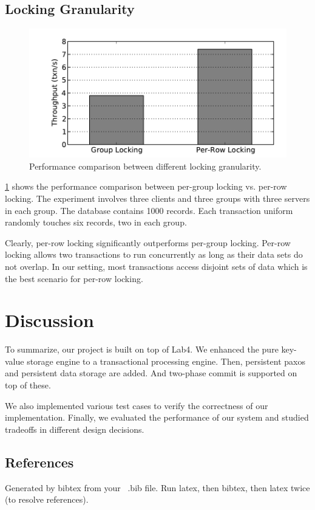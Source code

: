 \documentclass{vldb}
\begin{document}
\subsection{Locking Granularity}

\begin{figure}[t!]
	\centering
	\includegraphics[width=0.6\columnwidth]{figs/locking_granularity.pdf}
    \caption{
		Performance comparison between different locking granularity.
	}
	\label{fig:locking-granularity}
\end{figure}

\cref{fig:locking-granularity} shows the performance comparison 
between per-group locking vs. per-row locking. The experiment involves 
three clients and three groups with three servers in each group. The 
database contains 1000 records. Each transaction uniform randomly 
touches six records, two in each group. 

Clearly, per-row locking significantly outperforms per-group locking.  
Per-row locking allows two transactions to run concurrently as long as 
their data sets do not overlap. In our setting, most transactions 
access disjoint sets of data which is the best scenario for per-row 
locking. 

\section{Discussion}

To summarize, our project is built on top of Lab4. We enhanced the 
pure key-value storage engine to a transactional processing engine.
Then, persistent paxos and persistent data storage are added. And 
two-phase commit is supported on top of these. 

We also implemented various test cases to verify the correctness of 
our implementation. Finally, we evaluated the performance of our 
system and studied tradeoffs in different design decisions.




\subsection{References}
Generated by bibtex from your ~.bib file.  Run latex,
then bibtex, then latex twice (to resolve references).
\end{document}
